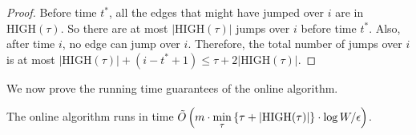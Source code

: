 \begin{proof}
    Before time $t^*$, all the edges that might have jumped over $i$ are in $\text{HIGH}(\tau)$. 
    So there are at most $|\text{HIGH}(\tau)|$ jumps over $i$ before time $t^*$.
    Also, after time $i$, no edge can jump over $i$.
    Therefore, the total number of jumps over $i$ is at most $|\text{HIGH}(\tau)| + (i-t^*+1) \leq \tau + 2|\text{HIGH}(\tau)|$.   
\end{proof}

We now prove the running time guarantees of the online algorithm.  

 \begin{lemma}\label{lem:pred_runtime}
    The online algorithm runs in time $\Tilde{O}\left(m \cdot \min\limits_{\tau} \left\{\tau + |\text{HIGH}(\tau)|\right\}\cdot \log W / \epsilon \right)$.
\end{lemma}

